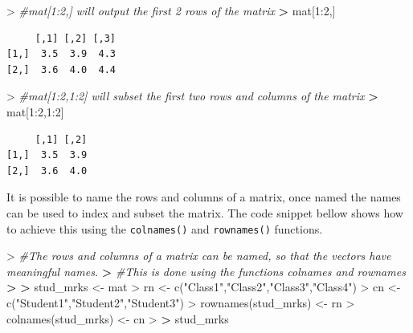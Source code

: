 \documentclass[
]{book}
\newenvironment{Shaded}{\begin{snugshade}}{\end{snugshade}}
\newcommand{\CommentTok}[1]{\textcolor[rgb]{0.56,0.35,0.01}{\textit{#1}}}
\newcommand{\DecValTok}[1]{\textcolor[rgb]{0.00,0.00,0.81}{#1}}
\newcommand{\ErrorTok}[1]{\textcolor[rgb]{0.64,0.00,0.00}{\textbf{#1}}}
\newcommand{\FunctionTok}[1]{\textcolor[rgb]{0.00,0.00,0.00}{#1}}
\newcommand{\NormalTok}[1]{#1}
\newcommand{\OtherTok}[1]{\textcolor[rgb]{0.56,0.35,0.01}{#1}}
\newcommand{\SpecialCharTok}[1]{\textcolor[rgb]{0.00,0.00,0.00}{#1}}
\newcommand{\StringTok}[1]{\textcolor[rgb]{0.31,0.60,0.02}{#1}}
\theoremstyle{definition}
\theoremstyle{definition}
\theoremstyle{definition}
\theoremstyle{definition}
\theoremstyle{remark}
\begin{document}
\begin{Shaded}
\begin{Highlighting}[]
\SpecialCharTok{\textgreater{}} \CommentTok{\#mat[1:2,] will output the first 2 rows of the matrix}
\ErrorTok{\textgreater{}}\NormalTok{ mat[}\DecValTok{1}\SpecialCharTok{:}\DecValTok{2}\NormalTok{,]}
\end{Highlighting}
\end{Shaded}

\begin{verbatim}
     [,1] [,2] [,3]
[1,]  3.5  3.9  4.3
[2,]  3.6  4.0  4.4
\end{verbatim}

\begin{Shaded}
\begin{Highlighting}[]
\SpecialCharTok{\textgreater{}} \CommentTok{\#mat[1:2,1:2] will subset the first two rows and columns of the matrix}
\ErrorTok{\textgreater{}}\NormalTok{ mat[}\DecValTok{1}\SpecialCharTok{:}\DecValTok{2}\NormalTok{,}\DecValTok{1}\SpecialCharTok{:}\DecValTok{2}\NormalTok{]}
\end{Highlighting}
\end{Shaded}

\begin{verbatim}
     [,1] [,2]
[1,]  3.5  3.9
[2,]  3.6  4.0
\end{verbatim}

It is possible to name the rows and columns of a matrix, once named the names can be used to index and subset the matrix.
The code snippet bellow shows how to achieve this using the \texttt{colnames()} and \texttt{rownames()} functions.

\begin{Shaded}
\begin{Highlighting}[]
\SpecialCharTok{\textgreater{}} \CommentTok{\#The rows and columns of a matrix can be named, so that the vectors have meaningful names.}
\ErrorTok{\textgreater{}} \CommentTok{\#This is done using the functions colnames and rownames}
\ErrorTok{\textgreater{}} 
\ErrorTok{\textgreater{}}\NormalTok{ stud\_mrks }\OtherTok{\textless{}{-}}\NormalTok{ mat}
\SpecialCharTok{\textgreater{}}\NormalTok{ rn }\OtherTok{\textless{}{-}} \FunctionTok{c}\NormalTok{(}\StringTok{"Class1"}\NormalTok{,}\StringTok{"Class2"}\NormalTok{,}\StringTok{"Class3"}\NormalTok{,}\StringTok{"Class4"}\NormalTok{)}
\SpecialCharTok{\textgreater{}}\NormalTok{ cn }\OtherTok{\textless{}{-}} \FunctionTok{c}\NormalTok{(}\StringTok{"Student1"}\NormalTok{,}\StringTok{"Student2"}\NormalTok{,}\StringTok{"Student3"}\NormalTok{)}
\SpecialCharTok{\textgreater{}} \FunctionTok{rownames}\NormalTok{(stud\_mrks) }\OtherTok{\textless{}{-}}\NormalTok{ rn}
\SpecialCharTok{\textgreater{}} \FunctionTok{colnames}\NormalTok{(stud\_mrks) }\OtherTok{\textless{}{-}}\NormalTok{ cn}
\SpecialCharTok{\textgreater{}} 
\ErrorTok{\textgreater{}}\NormalTok{ stud\_mrks}
\end{Highlighting}
\end{Shaded}
\end{document}
